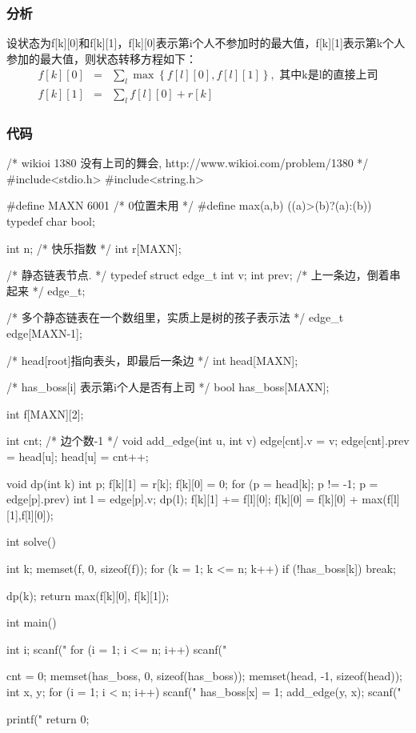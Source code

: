 \subsubsection{分析}
设状态为f[k][0]和f[k][1]，f[k][0]表示第i个人不参加时的最大值，f[k][1]表示第k个人参加的最大值，则状态转移方程如下：
\begin{eqnarray}
f[k][0] &=& \sum_l\max\left\{f[l][0],f[l][1]\right\}, \text{ 其中k是l的直接上司} \nonumber \\
f[k][1] &=& \sum_l {f[l][0]}+r[k] \nonumber
\end{eqnarray}

\subsubsection{代码}

\begin{Codex}[label=ball.c]
/* wikioi 1380 没有上司的舞会, http://www.wikioi.com/problem/1380 */
#include<stdio.h>
#include<string.h>

#define MAXN 6001 /* 0位置未用 */
#define max(a,b) ((a)>(b)?(a):(b))
typedef char bool;

int n;
/* 快乐指数 */
int r[MAXN];

/* 静态链表节点. */
typedef struct edge_t {
    int v;
    int prev; /* 上一条边，倒着串起来 */
} edge_t;

/* 多个静态链表在一个数组里，实质上是树的孩子表示法 */
edge_t edge[MAXN-1];

/* head[root]指向表头，即最后一条边 */
int head[MAXN];

/* has_boss[i] 表示第i个人是否有上司 */
bool has_boss[MAXN];

int f[MAXN][2];

int cnt;  /* 边个数-1 */
void add_edge(int u, int v) {
    edge[cnt].v = v;
    edge[cnt].prev = head[u];
    head[u] = cnt++;
}

void dp(int k) {
    int p;
    f[k][1] = r[k];
    f[k][0] = 0;
    for (p = head[k]; p != -1; p = edge[p].prev) {
        int l = edge[p].v;
        dp(l);
        f[k][1] += f[l][0];
        f[k][0] = f[k][0] + max(f[l][1],f[l][0]);
    }
}

int solve() {
    int k;
    memset(f, 0, sizeof(f));
    for (k = 1; k <= n; k++) if (!has_boss[k]) {
        break;
    }

    dp(k);
    return max(f[k][0], f[k][1]);
}

int main() {
    int i;
    scanf("%
    for (i = 1; i <= n; i++) scanf("%

    cnt = 0;
    memset(has_boss, 0, sizeof(has_boss));
    memset(head, -1, sizeof(head));
    int x, y;
    for (i = 1; i < n; i++) {
        scanf("%
        has_boss[x] = 1;
        add_edge(y, x);
    }
    scanf("%

    printf("%
    return 0;
}
\end{Codex}

